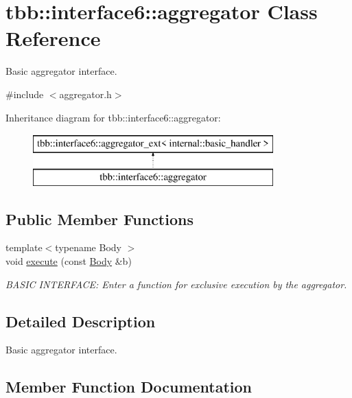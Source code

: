 \hypertarget{classtbb_1_1interface6_1_1aggregator}{}\section{tbb\+:\+:interface6\+:\+:aggregator Class Reference}
\label{classtbb_1_1interface6_1_1aggregator}


Basic aggregator interface.  




{\ttfamily \#include $<$aggregator.\+h$>$}

Inheritance diagram for tbb\+:\+:interface6\+:\+:aggregator\+:\begin{figure}[H]
\begin{center}
\leavevmode
\includegraphics[height=2.000000cm]{classtbb_1_1interface6_1_1aggregator}
\end{center}
\end{figure}
\subsection*{Public Member Functions}
\begin{DoxyCompactItemize}
\item 
{\footnotesize template$<$typename Body $>$ }\\void \hyperlink{classtbb_1_1interface6_1_1aggregator_aa7cc924b6f0d17578d61fd9002f59f84}{execute} (const \hyperlink{classBody}{Body} \&b)
\begin{DoxyCompactList}\small\item\em B\+A\+S\+I\+C I\+N\+T\+E\+R\+F\+A\+C\+E\+: Enter a function for exclusive execution by the aggregator. \end{DoxyCompactList}\end{DoxyCompactItemize}


\subsection{Detailed Description}
Basic aggregator interface. 

\subsection{Member Function Documentation}
\hypertarget{classtbb_1_1interface6_1_1aggregator_aa7cc924b6f0d17578d61fd9002f59f84}{}
